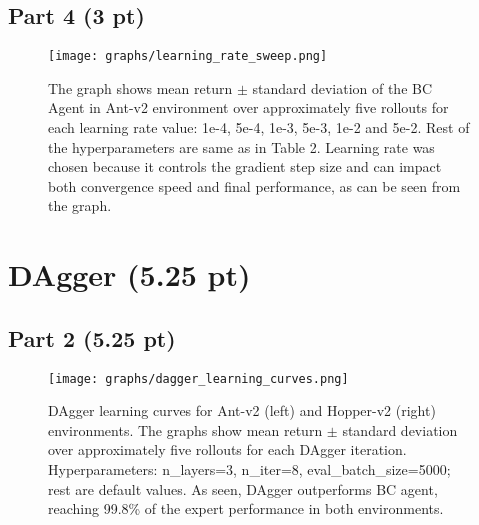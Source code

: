 \documentclass{article}
\begin{document}
\subsection{Part 4 (3 pt)}
\begin{figure*}[!h]
	\centering
\texttt{[image: graphs/learning\_rate\_sweep.png]}
	\caption{The graph shows mean return $\pm$ standard deviation of the BC Agent in Ant-v2 environment over approximately five rollouts for each learning rate value: 1e-4, 5e-4, 1e-3, 5e-3, 1e-2 and 5e-2.
  Rest of the hyperparameters are same as in Table 2. 
  Learning rate was chosen because it controls the gradient step size and can impact both convergence speed and final performance, as can be seen from the graph.
  }
	\label{fig:p4}
\end{figure*}
\newpage
\section{DAgger (5.25 pt)}
\subsection{Part 2 (5.25 pt)}
\begin{figure*}[!h]
	\centering
	\texttt{[image: graphs/dagger\_learning\_curves.png]}
	\caption{DAgger learning curves for Ant-v2 (left) and Hopper-v2 (right) environments.
  The graphs show mean return $\pm$ standard deviation over approximately five rollouts for each DAgger iteration. 
  Hyperparameters: n\_layers=3, n\_iter=8, eval\_batch\_size=5000; rest are default values.
  As seen, DAgger outperforms BC agent, reaching 99.8\% of the expert performance in both environments.}
	\label{fig:p5}
\end{figure*}
\end{document}
